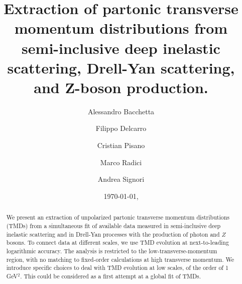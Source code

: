 \documentclass[aps,preprintnumbers,showpacs,nofootinbib,superscriptaddress,floatfix]{revtex4}
\begin{document}
\allowdisplaybreaks[2]


\title{
Extraction of partonic transverse momentum distributions 
from semi-inclusive deep
inelastic scattering, Drell-Yan scattering, and Z-boson production.
}

\author{Alessandro Bacchetta}

\author{Filippo Delcarro}

\author{Cristian Pisano}

\author{Marco Radici}

\author{Andrea Signori}

\begin{abstract}
We present an extraction of unpolarized partonic transverse momentum
distributions (TMDs) 
from a simultaneous fit of available data measured in semi-inclusive deep inelastic scattering 
and in Drell-Yan processes with the production of photon and $Z$ bosons. 
To connect data at different scales, we use TMD evolution at next-to-leading logarithmic accuracy. The
analysis is restricted to the low-transverse-momentum region, with no matching
to fixed-order calculations at high transverse momentum. We introduce specific
choices to deal with TMD evolution at low scales, of the order of 1 GeV$^2$.
This could be considered as a first attempt at a global fit of TMDs.
\end{abstract}


\date{\today, \currenttime}
\end{document}
